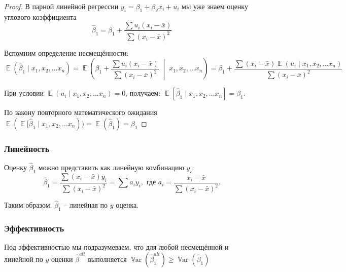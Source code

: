 \documentclass[12pt]{article}
\DeclareMathOperator{\Var}{\mathbb{V}ar}
\DeclareMathOperator{\E}{\mathbb{E}}
\newcommand{\hb}{\hat{\beta}}
\begin{document}
\begin{proof}
В парной линейной регрессии \( y_i = \beta_1 + \beta_2 x_i + u_i \) мы уже знаем оценку углового коэффициента \[\hat{\beta}_1 = \beta_1 + \frac{\sum u_i (x_i - \bar{x})}{\sum (x_i - \bar{x})^2}\]

Вспомним определение несмещённости:
\[ \E(\hat{\beta}_1 \mid x_1, x_2, \ldots x_n) = \E\left( \beta_1 + \frac{\sum u_i (x_i - \bar{x})}{\sum (x_i - \bar{x})^2} \;\middle|\; x_1, x_2, \ldots x_n \right) = \beta_1 + \frac{\sum (x_i - \bar{x}) \E(u_i \mid x_1, x_2, \ldots x_n)}{\sum (x_i - \bar{x})^2} \]

При условии \( \E(u_i \mid x_1, x_2, \ldots x_n) = 0 \), получаем:
\( \E[\hat{\beta}_1 \mid x_1, x_2, \ldots x_n] = \beta_1 \).

По закону повторного математического ожидания \( \E(\E[\hat{\beta}_1 \mid x_1, x_2, \ldots x_n))= \E(\hb_1) =  \beta_1 \)
\end{proof}

\subsubsection*{Линейность}

Оценку \( \hb_1 \) можно представить как линейную комбинацию \( y_i \):
\[\hb_1 = \frac{\sum (x_i - \bar{x}) y_i}{\sum (x_i - \bar{x})^2} = \sum a_i y_i, \text{ где } a_i = \frac{x_i - \bar{x}}{\sum (x_i - \bar{x})^2}. \]

Таким образом, \( \hb_1 \) -- линейная по $y$ оценка.

\subsubsection*{Эффективность}
Под эффективностью мы подразумеваем, что для любой несмещённой и линейной по $y$ оценки $\hb^{alt}$ выполняется $\Var(\hb^{alt}_1) \ge \Var(\hb_1)$
\end{document}
